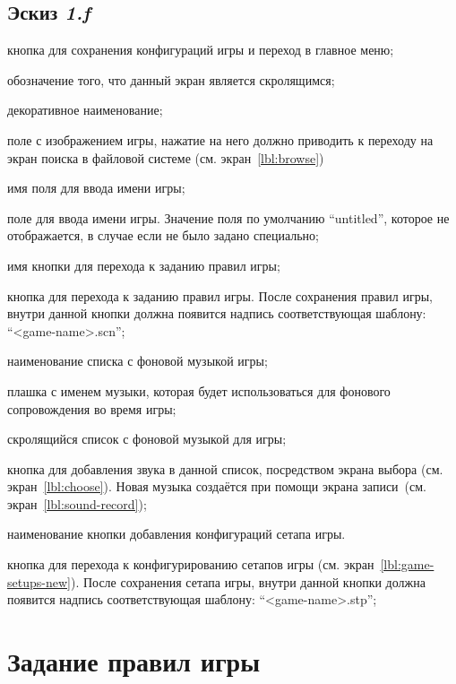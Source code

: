 \subsection{Эскиз \emph{1.f}}
\begin{enumerate*}
    \item кнопка для сохранения конфигураций игры и переход в главное меню;
    \item обозначение того, что данный экран является скролящимся;
    \item декоративное наименование;
    \item поле с изображением игры, нажатие на него должно приводить к переходу на экран поиска в файловой системе (см. экран~\ref{lbl:browse})
    \item имя поля для ввода имени игры;
    \item поле для ввода имени игры. Значение поля по умолчанию ``untitled'', которое не отображается, в случае если не было задано специально;
    \item имя кнопки для перехода к заданию правил игры;
    \item кнопка для перехода к заданию правил игры. После сохранения правил игры, внутри данной кнопки должна появится надпись соответствующая шаблону: ``<game-name>.scn'';
    \item наименование списка с фоновой музыкой игры;
    \item плашка с именем музыки, которая будет использоваться для фонового сопровождения во время игры;
    \item скролящийся список с фоновой музыкой для игры;
    \item кнопка для добавления звука в данной список, посредством экрана выбора (см. экран~\ref{lbl:choose}). Новая музыка создаётся при помощи экрана записи~(см. экран~\ref{lbl:sound-record});
    \item наименование кнопки добавления конфигураций сетапа игры.
    \item кнопка для перехода к конфигурированию сетапов игры (см. экран~\ref{lbl:game-setups-new}). После сохранения сетапа игры, внутри данной кнопки должна появится надпись соответствующая шаблону: ``<game-name>.stp'';
\end{enumerate*}

\section{Задание правил игры}\label{lbl:game-scenario-new}

